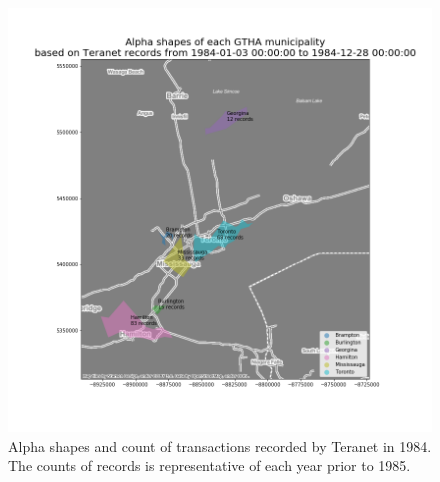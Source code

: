 \documentclass[11pt]{article}
\begin{document}
    \begin{figure}[hbt!]
        \centering
        \includegraphics[width=1\linewidth,trim=0.5 0.5 0.5 0.5,clip]{img/as_1984-01-03_1984-12-28.png}
        \caption{Alpha shapes and count of transactions recorded by Teranet in 1984.
        The counts of records is representative of each year prior to 1985.}
        \label{fig:teranet_as_1984}
    \end{figure}
\end{document}
